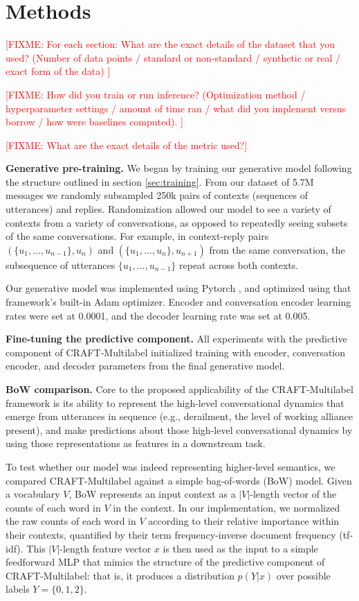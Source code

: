 \documentclass{article}
\newcommand{\fixme}[1]{\textcolor{red}{[FIXME: #1]}}
\begin{document}
\section{Methods}
\label{sec:methods}

\fixme{For each section: What are the exact details of the dataset that you used? (Number of data points / standard or non-standard / synthetic or real / exact form of the data)
}

\fixme{
How did you train or run inference? (Optimization method / hyperparameter settings / amount of time ran / what did you implement versus borrow / how were baselines computed).
}

\fixme{What are the exact details of the metric used?}

\textbf{Generative pre-training.} We began by training our generative model following the structure outlined in section \ref{sec:training}. From our dataset of 5.7M messages we randomly subsampled 250k pairs of contexts (sequences of utterances) and replies. Randomization allowed our model to see a variety of contexts from a variety of conversations, as opposed to repeatedly seeing subsets of the same conversations. For example, in context-reply pairs $(\{u_1,...,u_{n-1}\}, u_{n})$ and $(\{u_1,...,u_{n}\}, u_{n+1})$ from the same conversation, the subsequence of utterances $\{u_1,...,u_{n-1}\}$ repeat across both contexts.

Our generative model was implemented using Pytorch \cite{paszke2019pytorch}, and optimized using that framework's built-in Adam optimizer. Encoder and conversation encoder learning rates were set at 0.0001, and the decoder learning rate was set at 0.005.

\textbf{Fine-tuning the predictive component.} All experiments with the predictive component of CRAFT-Multilabel initialized training with encoder, conversation encoder, and decoder parameters from the final generative model.  

\textbf{BoW comparison.} Core to the proposed applicability of the CRAFT-Multilabel framework is its ability to represent the high-level conversational dynamics that emerge from utterances in sequence (e.g., derailment, the level of working alliance present), and make predictions about those high-level conversational dynamics by using those representations as features in a downstream task. 

To test whether our model was indeed representing higher-level semantics, we compared CRAFT-Multilabel against a simple bag-of-words (BoW) model. Given a vocabulary $V$, BoW represents an input context as a $|V|$-length vector of the counts of each word in $V$ in the context. In our implementation, we normalized the raw counts of each word in $V$ according to their relative importance within their contexts, quantified by their term frequency-inverse document frequency (tf-idf). This $|V|$-length feature vector $x$ is then used as the input to a simple feedforward MLP that mimics the structure of the predictive component of CRAFT-Multilabel: that is, it produces a distribution $p(Y|x)$ over possible labels $Y=\{0,1,2\}$.
\end{document}
